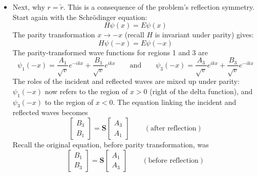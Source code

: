 \documentclass[11pt, a4paper]{article}
\newcommand{\eqtext}[1]{\qquad \text{#1} \qquad}
\newcommand{\schro}{Schr\"{o}dinger\xspace}
\newcommand{\mat}[1]{\mathbf{#1}} %
\begin{document}
\begin{itemize}
	\item Next, why $ r = \tilde{r} $. This is a consequence of the problem's reflection symmetry. Start again with the \schro equation:
	\begin{equation*}
		H \psi(x) = E \psi(x)
	\end{equation*}
	The parity transformation $ x \to -x $ (recall $ H $ is invariant under parity) gives:
	\begin{equation*}
		H\psi(-x) = E\psi(-x)
	\end{equation*}
	The parity-transformed wave functions for regions 1 and 3 are
	\begin{equation*}
		\psi_{1}(-x) = \frac{A_{1}}{\sqrt{v}} e^{-ikx} + \frac{B_{1}}{\sqrt{v}}e^{ikx} \eqtext{and} \psi_{3}(-x) = \frac{A_{3}}{\sqrt{v}} e^{ikx} + \frac{B_{3}}{\sqrt{v}}e^{-ikx}
	\end{equation*}
	The roles of the incident and reflected waves are mixed up under parity: $ \psi_{1}(-x) $ now refers to the region of $ x > 0 $ (right of the delta function), and $ \psi_{3}(-x) $ to the region of $ x < 0 $. The equation linking the incident and reflected waves becomes
	\begin{equation*}
		\begin{bmatrix}
			B_{3}\\
			B_{1} 
		\end{bmatrix}
		= 
		\mat{S}
		\begin{bmatrix}
			A_{3}\\
			A_{1}
		\end{bmatrix}
		\qquad (\text{after reflection})
	\end{equation*}
	Recall the original equation, before parity transformation, was
	\begin{equation*}
		\begin{bmatrix}
			B_{1}\\
			B_{3} 
		\end{bmatrix}
		= 
		\mat{S}
		\begin{bmatrix}
			A_{1}\\
			A_{3}
		\end{bmatrix}
		\qquad (\text{before reflection})
	\end{equation*}
	

\end{itemize}
\end{document}
